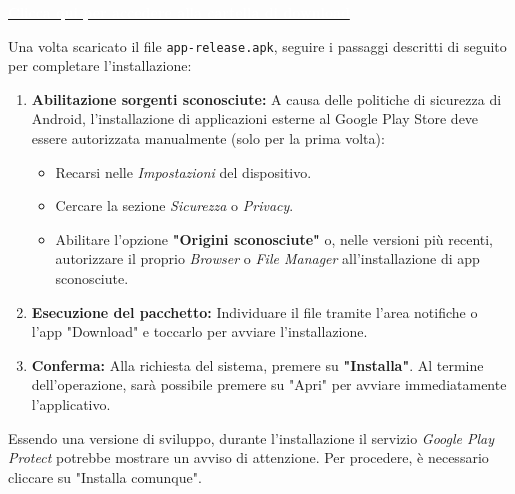 \documentclass[a4paper,12pt]{article}
\begin{document}
\begin{center}
    \begin{tcolorbox}[colback=blue!60!white,colframe=blue!80!black,width=0.8\textwidth,arc=3mm,auto outer arc, center title, title=\textbf{SCARICA L'APP (APK)}]
        \centering \href{https://github.com/SWE-BitByBit/project-MVP/tree/main/install_app}{\textcolor{white}{\textbf{Clicca qui per accedere alla cartella di download}}}
    \end{tcolorbox}
\end{center}

Una volta scaricato il file \texttt{app-release.apk}, seguire i passaggi descritti di seguito per completare l'installazione:

\begin{enumerate}
    \item \textbf{Abilitazione sorgenti sconosciute:} 
    A causa delle politiche di sicurezza di Android, l'installazione di applicazioni esterne al Google Play Store deve essere autorizzata manualmente (solo per la prima volta):
    \begin{itemize}
        \item Recarsi nelle \textit{Impostazioni} del dispositivo.
        \item Cercare la sezione \textit{Sicurezza} o \textit{Privacy}.
        \item Abilitare l'opzione \textbf{"Origini sconosciute"} o, nelle versioni più recenti, autorizzare il proprio \textit{Browser} o \textit{File Manager} all'installazione di app sconosciute.
    \end{itemize}
    \item \textbf{Esecuzione del pacchetto:} Individuare il file tramite l'area notifiche o l'app "Download" e toccarlo per avviare l'installazione.
    \item \textbf{Conferma:} Alla richiesta del sistema, premere su \textbf{"Installa"}. Al termine dell'operazione, sarà possibile premere su "Apri" per avviare immediatamente l'applicativo.
\end{enumerate}

\begin{tcolorbox}[colback=blue!5!white,colframe=blue!75!black,title=Nota sulla sicurezza]
    Essendo una versione di sviluppo, durante l'installazione il servizio \textit{Google Play Protect} potrebbe mostrare un avviso di attenzione. Per procedere, è necessario cliccare su "Installa comunque".
\end{tcolorbox}
\end{document}
